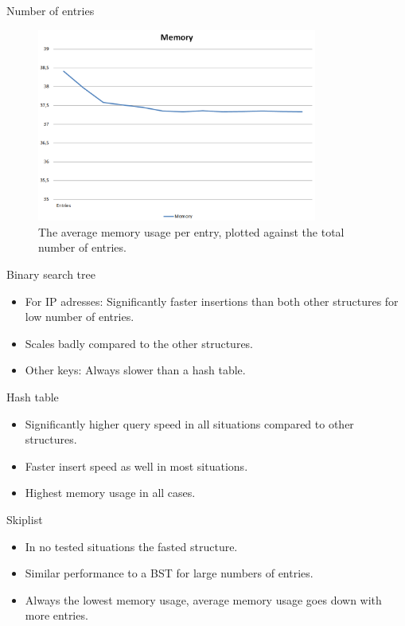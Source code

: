 \documentclass[10pt]{beamer}
\begin{document}
\begin{frame}{Number of entries}
    \begin{figure}
      \centering
        \includegraphics[width=0.82\textwidth]{SkiplistMemory}
      \caption{The average memory usage per entry, plotted against the total number of entries.}
    \end{figure}
\end{frame}

\begin{frame}{Binary search tree}
    \begin{itemize}
        \item For IP adresses: Significantly faster insertions than both other structures for low number of entries.
        \item Scales badly compared to the other structures.
        \item Other keys: Always slower than a hash table.
    \end{itemize}
\end{frame}

\begin{frame}{Hash table}
    \begin{itemize}
        \item Significantly higher query speed in all situations compared to other structures.
        \item Faster insert speed as well in most situations.
        \item Highest memory usage in all cases.
    \end{itemize}
\end{frame}

\begin{frame}{Skiplist}
    \begin{itemize}
        \item In no tested situations the fasted structure.
        \item Similar performance to a BST for large numbers of entries.
        \item Always the lowest memory usage, average memory usage goes down with more entries.
    \end{itemize}
\end{frame}
\end{document}
